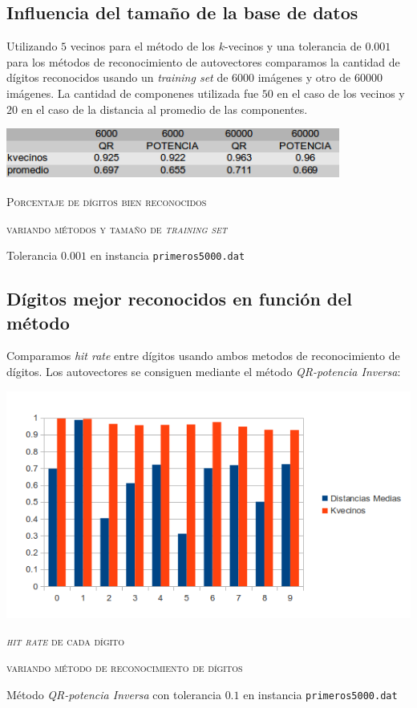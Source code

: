 	\subsection{Influencia del tama\~no de la base de datos}

		Utilizando $5$ vecinos para el m\'etodo de los $k$-vecinos y una tolerancia
		de $0.001$ para los m\'etodos de reconocimiento de autovectores comparamos
		la cantidad de d\'igitos reconocidos usando un \textit{training set} de
		$6000$ im\'agenes y otro de $60000$ im\'agenes.
		La cantidad de componenes utilizada fue $50$ en el caso de los vecinos
		y $20$ en el caso de la distancia al promedio de las componentes.

		\vspace{5mm}
		\centerline{\includegraphics[width=11cm]{img/tamBaseDatos.png}}
		\centerline{\textsc{Porcentaje de d\'igitos bien reconocidos}}
		\centerline{\textsc{variando m\'etodos y tama\~no de \textit{training set}}}
		\centerline{Tolerancia $0.001$ en instancia \texttt{primeros5000.dat}}
		\vspace{5mm}


	\subsection{D\'igitos mejor reconocidos en funci\'on del m\'etodo}

		Comparamos \textit{hit rate} entre d\'igitos usando ambos metodos de reconocimiento
		de d\'igitos. Los autovectores se consiguen mediante el m\'etodo
		\textit{QR-potencia Inversa}:

		\vspace{5mm}
		\centerline{\includegraphics[width=14cm]{img/bam.png}}
		\centerline{\textsc{\textit{hit rate} de cada d\'igito}}
		\centerline{\textsc{variando m\'etodo de reconocimiento de d\'igitos}}
		\centerline{M\'etodo \textit{QR-potencia Inversa} con tolerancia $0.1$ en
		instancia \texttt{primeros5000.dat}}
		\vspace{5mm}
